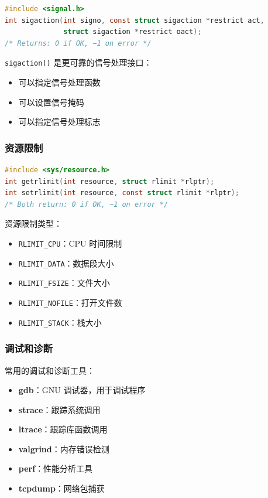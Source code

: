 \begin{lstlisting}[language=C]
#include <signal.h>
int sigaction(int signo, const struct sigaction *restrict act,
              struct sigaction *restrict oact);
/* Returns: 0 if OK, −1 on error */
\end{lstlisting}

\texttt{sigaction()} 是更可靠的信号处理接口：
\begin{itemize}
  \item 可以指定信号处理函数
  \item 可以设置信号掩码
  \item 可以指定信号处理标志
\end{itemize}

\subsubsection{资源限制}


\begin{lstlisting}[language=C]
#include <sys/resource.h>
int getrlimit(int resource, struct rlimit *rlptr);
int setrlimit(int resource, const struct rlimit *rlptr);
/* Both return: 0 if OK, −1 on error */
\end{lstlisting}

资源限制类型：
\begin{itemize}
  \item \texttt{RLIMIT\_CPU}：CPU 时间限制
  \item \texttt{RLIMIT\_DATA}：数据段大小
  \item \texttt{RLIMIT\_FSIZE}：文件大小
  \item \texttt{RLIMIT\_NOFILE}：打开文件数
  \item \texttt{RLIMIT\_STACK}：栈大小
\end{itemize}

\subsubsection{调试和诊断}


常用的调试和诊断工具：
\begin{itemize}
  \item \textbf{gdb}：GNU 调试器，用于调试程序
  \item \textbf{strace}：跟踪系统调用
  \item \textbf{ltrace}：跟踪库函数调用
  \item \textbf{valgrind}：内存错误检测
  \item \textbf{perf}：性能分析工具
  \item \textbf{tcpdump}：网络包捕获
\end{itemize}

